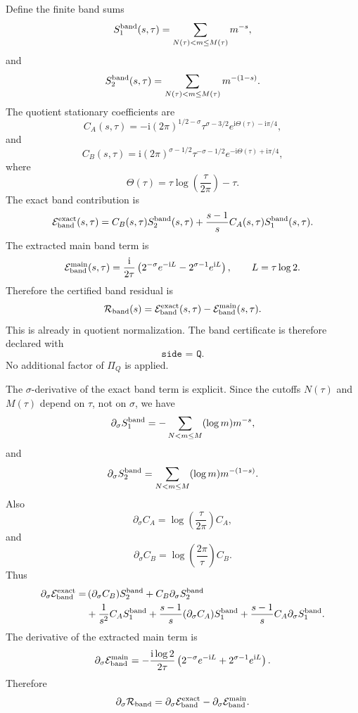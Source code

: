 \documentclass[11pt]{article}
\newcommand{\ii}{\mathrm{i}}
\newcommand{\s}{s}
\newcommand{\sig}{\sigma}
\newcommand{\tauh}{\tau}
\newcommand{\Rband}{\mathcal R_{\rm band}}
\newcommand{\PiQ}{\Pi_Q}
\newcommand{\JSON}[1]{\texttt{#1}}
\begin{document}
Define the finite band sums
\[
        S_1^{\rm band}(\s,\tauh)
        =
        \sum_{N(\tauh)<m\le M(\tauh)} m^{-\s},
\]
and
\[
        S_2^{\rm band}(\s,\tauh)
        =
        \sum_{N(\tauh)<m\le M(\tauh)} m^{-(1-\s)}.
\]
The quotient stationary coefficients are
\[
        C_A(\s,\tauh)
        =
        -\ii(2\pi)^{1/2-\sig}
        \tauh^{\sig-3/2}
        e^{\ii\Theta(\tauh)-\ii\pi/4},
\]
and
\[
        C_B(\s,\tauh)
        =
        \ii(2\pi)^{\sig-1/2}
        \tauh^{-\sig-1/2}
        e^{-\ii\Theta(\tauh)+\ii\pi/4},
\]
where
\[
        \Theta(\tauh)
        =
        \tauh\log\left(\frac{\tauh}{2\pi}\right)-\tauh.
\]
The exact band contribution is
\[
        \mathcal E_{\rm band}^{\rm exact}(\s,\tauh)
        =
        C_B(\s,\tauh)S_2^{\rm band}(\s,\tauh)
        +
        \frac{\s-1}{\s}
        C_A(\s,\tauh)S_1^{\rm band}(\s,\tauh).
\]
The extracted main band term is
\[
        \mathcal E_{\rm band}^{\rm main}(\s,\tauh)
        =
        \frac{\ii}{2\tauh}
        \left(
            2^{-\sig}e^{-\ii L}
            -
            2^{\sig-1}e^{\ii L}
        \right),
        \qquad
        L=\tauh\log2.
\]
Therefore the certified band residual is
\[
        \Rband(\s)
        =
        \mathcal E_{\rm band}^{\rm exact}(\s,\tauh)
        -
        \mathcal E_{\rm band}^{\rm main}(\s,\tauh).
\]
This is already in quotient normalization.  The band certificate is therefore
declared with
\[
        \JSON{side = Q}.
\]
No additional factor of \(\PiQ\) is applied.

The \(\sig\)-derivative of the exact band term is explicit.  Since the cutoffs
\(N(\tauh)\) and \(M(\tauh)\) depend on \(\tauh\), not on \(\sig\), we have
\[
        \partial_\sig S_1^{\rm band}
        =
        -\sum_{N<m\le M}(\log m)m^{-\s},
\]
and
\[
        \partial_\sig S_2^{\rm band}
        =
        \sum_{N<m\le M}(\log m)m^{-(1-\s)}.
\]
Also
\[
        \partial_\sig C_A
        =
        \log\left(\frac{\tauh}{2\pi}\right)C_A,
\]
and
\[
        \partial_\sig C_B
        =
        \log\left(\frac{2\pi}{\tauh}\right)C_B.
\]
Thus
\[
\begin{aligned}
        \partial_\sig\mathcal E_{\rm band}^{\rm exact}
        =
        &\,
        (\partial_\sig C_B)S_2^{\rm band}
        +
        C_B\partial_\sig S_2^{\rm band}
        \\
        &+
        \frac{1}{\s^2} C_A S_1^{\rm band}
        +
        \frac{\s-1}{\s}
        (\partial_\sig C_A)S_1^{\rm band}
        +
        \frac{\s-1}{\s}
        C_A\partial_\sig S_1^{\rm band}.
\end{aligned}
\]
The derivative of the extracted main term is
\[
        \partial_\sig\mathcal E_{\rm band}^{\rm main}
        =
        -\frac{\ii\log2}{2\tauh}
        \left(
            2^{-\sig}e^{-\ii L}
            +
            2^{\sig-1}e^{\ii L}
        \right).
\]
Therefore
\[
        \partial_\sig\Rband
        =
        \partial_\sig\mathcal E_{\rm band}^{\rm exact}
        -
        \partial_\sig\mathcal E_{\rm band}^{\rm main}.
\]
\end{document}
